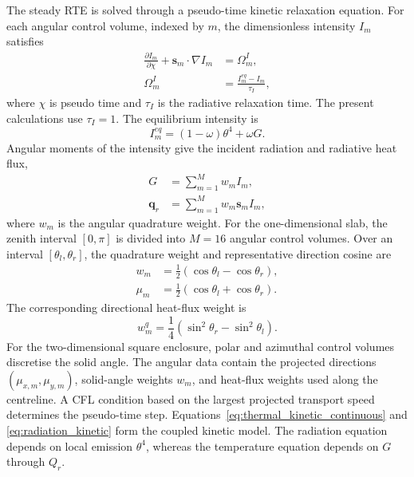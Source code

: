 \documentclass[a4paper,12pt]{ctexart}
\numberwithin{equation}{section}
\newcommand{\vb}[1]{\bm{#1}}
\newcommand{\vs}{\vb{s}}
\newcommand{\vq}{\vb{q}}
\begin{document}
The steady RTE is solved through a pseudo-time kinetic relaxation equation. For each angular control volume, indexed by $m$, the dimensionless intensity $I_m$ satisfies
\begin{equation}
\begin{aligned}
\frac{\partial I_m}{\partial \chi}+\vs_m\cdot\nabla I_m&=\Omega_m^I,
\\
\Omega_m^I&=\frac{I_m^{eq}-I_m}{\tau_I},
\end{aligned}
\label{eq:radiation_kinetic}
\end{equation}
where $\chi$ is pseudo time and $\tau_I$ is the radiative relaxation time. The present calculations use $\tau_I=1$. The equilibrium intensity is
\begin{equation}
I_m^{eq}=(1-\omega)\theta^4+\omega G.
\label{eq:radiation_equilibrium}
\end{equation}
Angular moments of the intensity give the incident radiation and radiative heat flux,
\begin{equation}
\begin{aligned}
G&=\sum_{m=1}^{M}w_m I_m,
\\
\vq_r&=\sum_{m=1}^{M}w_m\vs_m I_m,
\end{aligned}
\label{eq:angular_moments}
\end{equation}
where $w_m$ is the angular quadrature weight. For the one-dimensional slab, the zenith interval $[0,\pi]$ is divided into $M=16$ angular control volumes. Over an interval $[\theta_l,\theta_r]$, the quadrature weight and representative direction cosine are
\begin{equation*}
\begin{aligned}
w_m&=\frac{1}{2}(\cos\theta_l-\cos\theta_r),
\\
\mu_m&=\frac{1}{2}(\cos\theta_l+\cos\theta_r).
\end{aligned}
\end{equation*}
The corresponding directional heat-flux weight is
\begin{equation*}
w_m^q=\frac{1}{4}(\sin^2\theta_r-\sin^2\theta_l).
\end{equation*}
For the two-dimensional square enclosure, polar and azimuthal control volumes discretise the solid angle. The angular data contain the projected directions $(\mu_{x,m},\mu_{y,m})$, solid-angle weights $w_m$, and heat-flux weights used along the centreline. A CFL condition based on the largest projected transport speed determines the pseudo-time step. Equations~\eqref{eq:thermal_kinetic_continuous} and \eqref{eq:radiation_kinetic} form the coupled kinetic model. The radiation equation depends on local emission $\theta^4$, whereas the temperature equation depends on $G$ through $Q_r$.
\end{document}
